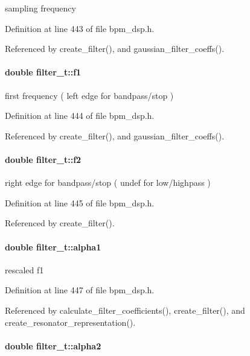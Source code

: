 sampling frequency 

Definition at line 443 of file bpm\_\-dsp.h.

Referenced by create\_\-filter(), and gaussian\_\-filter\_\-coeffs().
\paragraph[f1]{\setlength{\rightskip}{0pt plus 5cm}double {\bf filter\_\-t::f1}}\hfill\label{structfilter__t_ee11cdb8bd177a80af5a8145ef2994a7}


first frequency ( left edge for bandpass/stop ) 

Definition at line 444 of file bpm\_\-dsp.h.

Referenced by create\_\-filter(), and gaussian\_\-filter\_\-coeffs().
\paragraph[f2]{\setlength{\rightskip}{0pt plus 5cm}double {\bf filter\_\-t::f2}}\hfill\label{structfilter__t_f20ed86d13f7d772b34d24fdad574d98}


right edge for bandpass/stop ( undef for low/highpass ) 

Definition at line 445 of file bpm\_\-dsp.h.

Referenced by create\_\-filter().
\paragraph[alpha1]{\setlength{\rightskip}{0pt plus 5cm}double {\bf filter\_\-t::alpha1}}\hfill\label{structfilter__t_cc6b5340d5c29772295c9e9a77996875}


rescaled f1 

Definition at line 447 of file bpm\_\-dsp.h.

Referenced by calculate\_\-filter\_\-coefficients(), create\_\-filter(), and create\_\-resonator\_\-representation().
\paragraph[alpha2]{\setlength{\rightskip}{0pt plus 5cm}double {\bf filter\_\-t::alpha2}}\hfill\label{structfilter__t_8124f521ac4d25e9afbca612f8afa202}


